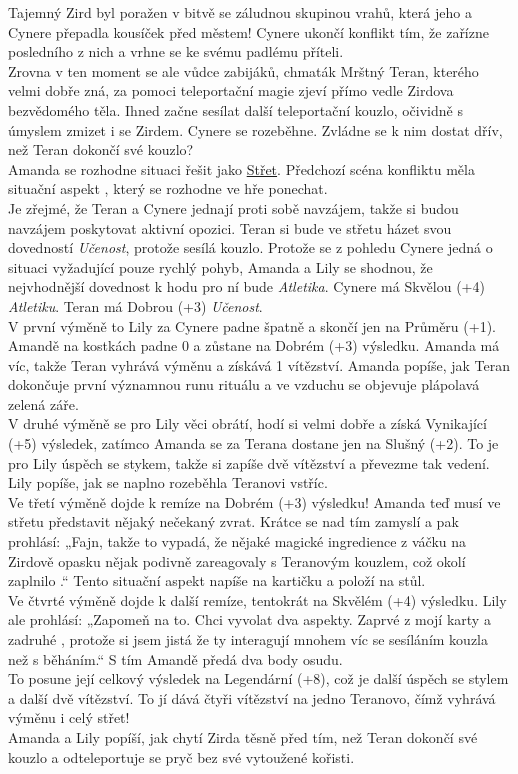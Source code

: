 \documentclass[../main.tex]{subfiles}
\begin{document}
Tajemný Zird byl poražen v bitvě se záludnou skupinou vrahů, která jeho a Cynere přepadla kousíček před městem! Cynere ukončí konflikt tím, že zařízne posledního z nich a vrhne se ke svému padlému příteli. \\
Zrovna v ten moment se ale vůdce zabijáků, chmaták Mrštný Teran, kterého velmi dobře zná, za pomoci teleportační magie zjeví přímo vedle Zirdova bezvědomého těla. Ihned začne sesílat další teleportační kouzlo, očividně s úmyslem zmizet i se Zirdem. Cynere se rozeběhne. Zvládne se k nim dostat dřív, než Teran dokončí své kouzlo?\\
Amanda se rozhodne situaci řešit jako \underline{Střet}. Předchozí scéna konfliktu měla situační aspekt , který se rozhodne ve hře ponechat.\\
Je zřejmé, že Teran a Cynere jednají proti sobě navzájem, takže si budou navzájem poskytovat aktivní opozici. Teran si bude ve střetu házet svou dovedností \textit{Učenost}, protože sesílá kouzlo. Protože se z pohledu Cynere jedná o situaci vyžadující pouze rychlý pohyb, Amanda a Lily se shodnou, že nejvhodnější dovednost k hodu pro ní bude \textit{Atletika}.
Cynere má Skvělou (+4) \textit{Atletiku}. Teran má Dobrou (+3) \textit{Učenost}.\\
V první výměně to Lily za Cynere padne špatně a skončí jen na Průměru (+1). Amandě na kostkách padne 0 a zůstane na Dobrém (+3) výsledku. Amanda má víc, takže Teran vyhrává výměnu a získává 1 vítězství. Amanda popíše, jak Teran dokončuje první významnou runu rituálu a ve vzduchu se objevuje plápolavá zelená záře.\\
V druhé výměně se pro Lily věci obrátí, hodí si velmi dobře a získá Vynikající (+5) výsledek, zatímco Amanda se za Terana dostane jen na Slušný (+2). To je pro Lily úspěch se stykem, takže si zapíše dvě vítězství a převezme tak vedení. Lily popíše, jak se naplno rozeběhla Teranovi vstříc.\\
Ve třetí výměně dojde k remíze na Dobrém (+3) výsledku! Amanda teď musí ve střetu představit nějaký nečekaný zvrat. Krátce se nad tím zamyslí a pak prohlásí: „Fajn, takže to vypadá, že nějaké magické ingredience z váčku na Zirdově opasku nějak podivně zareagovaly s Teranovým kouzlem, což okolí zaplnilo .“ Tento situační aspekt napíše na kartičku a položí na stůl. \\
Ve čtvrté výměně dojde k další remíze, tentokrát na Skvělém (+4) výsledku. Lily ale prohlásí: „Zapomeň na to. Chci vyvolat dva aspekty. Zaprvé  z mojí karty a zadruhé , protože si jsem jistá že ty interagují mnohem víc se sesíláním kouzla než s běháním.“ S tím Amandě předá dva body osudu.\\
To posune její celkový výsledek na Legendární (+8), což je další úspěch se stylem a další dvě vítězství. To jí dává čtyři vítězství na jedno Teranovo, čímž vyhrává výměnu i celý střet!\\
Amanda a Lily popíší, jak chytí Zirda těsně před tím, než Teran dokončí své kouzlo a odteleportuje se pryč bez své vytoužené kořisti.
\end{document}
